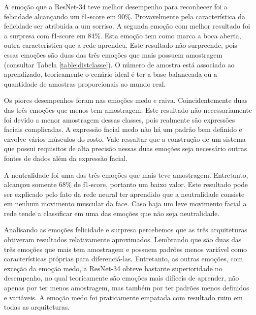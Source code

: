 A emoção que a ResNet-34 teve melhor desempenho para reconhecer foi a felicidade alcançando um f1-score em 90\%. Provavelmente pela característica da felicidade ser atribuída a um sorriso. A segunda emoção com melhor resultado foi a surpresa com f1-score em 84\%. Esta emoção tem como marca a boca aberta, outra característica que a rede aprendeu. Este resultado não surpreende, pois essas emoções são duas das três emoções que mais possuem amostragem (consultar Tabela \ref{table:distclasse}). O número de amostra está associado ao aprendizado, teoricamente o cenário ideal é ter a base balanceada ou a quantidade de amostras proporcionais ao mundo real.

Os piores desempenhos foram nas emoções medo e raiva. Coincidentemente duas das três emoções que menos tem amostragem. Este resultado não necessariamente foi devido a menor amostragem dessas classes, pois realmente são expressões faciais complicadas. A expressão facial medo não há um padrão bem definido e envolve vários músculos do rosto. Vale ressaltar que a construção de um sistema que possui requisitos de alta precisão nessas duas emoções seja necessário outras fontes de dados além da expressão facial. 

A neutralidade foi uma das três emoções que mais teve amostragem. Entretanto, alcançou somente 68\% de f1-score, portanto um baixo valor. Este resultado pode ser explicado pelo fato da rede neural ter aprendido que a neutralidade consiste em nenhum movimento muscular da face. Caso haja um leve movimento facial a rede tende a classificar em uma das emoções que não seja neutralidade.

Analisando as emoções felicidade e surpresa percebemos que as três arquiteturas obtiveram resultados relativamente aproximados. Lembrando que são duas das três emoções que mais tem amostragem e possuem padrões menos variável como características próprias para diferenciá-las. Entretanto, as outras emoções, com exceção da emoção medo, a ResNet-34 obteve bastante superioridade no desempenho, no qual teoricamente são emoções mais difíceis de aprender, não apenas por ter menos amostragem, mas também por ter padrões menos definidos e variáveis. A emoção medo foi praticamente empatada com resultado ruim em todas as arquiteturas. 





